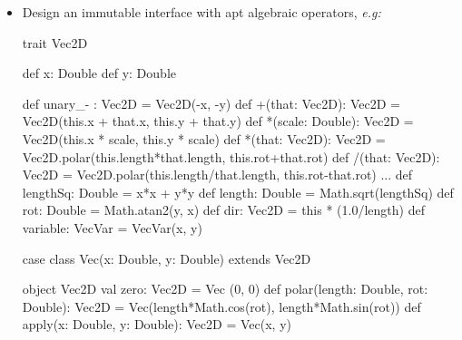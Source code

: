 \documentclass{ip3}
\begin{document}
\begin{foil}
\begin{itemize}
\item Design an immutable interface with apt algebraic operators, \textit{e.g:}
\begin{-code}

  trait Vec2D {
    def x:   Double
    def y:   Double
    
    def unary_- : Vec2D         = Vec2D(-x, -y)
    def +(that: Vec2D):   Vec2D = Vec2D(this.x + that.x, this.y + that.y)
    def *(scale: Double): Vec2D = Vec2D(this.x * scale, this.y * scale)
    def *(that: Vec2D):   Vec2D = Vec2D.polar(this.length*that.length, this.rot+that.rot)
    def /(that: Vec2D):   Vec2D = Vec2D.polar(this.length/that.length, this.rot-that.rot)
    ...     
    def lengthSq: Double = x*x + y*y
    def length:   Double = Math.sqrt(lengthSq)
    def rot:      Double = Math.atan2(y, x)
    def dir:      Vec2D  = this * (1.0/length)
    def variable: VecVar = VecVar(x, y)
  }
   
  case class Vec(x: Double, y: Double) extends Vec2D
\end{-code}
\begin{-code}    
  object Vec2D {
    val zero:                               Vec2D = Vec (0, 0)
    def polar(length: Double, rot: Double): Vec2D = Vec(length*Math.cos(rot), length*Math.sin(rot))
    def apply(x: Double, y: Double):        Vec2D = Vec(x, y)
  }      
\end{-code}
\end{itemize}
\end{foil}
\end{document}
